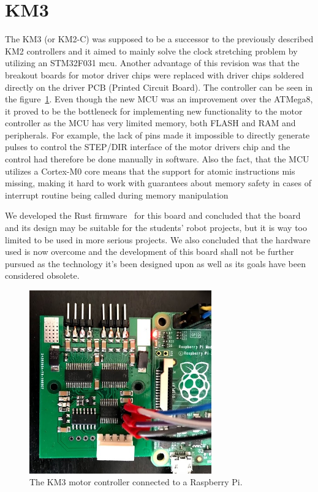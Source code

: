 \section{KM3}
\label{sec:km3}
The KM3 (or KM2-C) was supposed to be a successor to the previously described KM2 controllers and it aimed to mainly solve the clock stretching problem by utilizing an STM32F031 \acs{mcu}.
Another advantage of this revision was that the breakout boards for motor driver chips were replaced with driver chips soldered directly on the driver PCB (Printed Circuit Board).
The controller can be seen in the figure~\ref{fig:km3}.
Even though the new MCU was an improvement over the ATMega8, it proved to be the bottleneck for implementing new functionality to the motor controller as the MCU has very limited memory, both FLASH and RAM and peripherals.
For example, the lack of pins made it impossible to directly generate pulses to control the STEP/DIR interface of the motor drivers chip and the control had therefore be done manually in software.
Also the fact, that the MCU utilizes a Cortex-M0 core means that the support for atomic instructions mis missing, making it hard to work with guarantees about memory safety in cases of interrupt routine being called during memory manipulation

We developed the Rust firmware~\cite{hybl_robotics-butkm3-rs_2020} for this board and concluded that the board and its design may be suitable for the students' robot projects, but it is way too limited to be used in more serious projects.
We also concluded that the hardware used is now overcome and the development of this board shall not be further pursued as the technology it's been designed upon as well as its goals have been considered obsolete.

\begin{figure}[H]
    \centering
    \includegraphics[width=0.7\textwidth]{obrazky/km3}
    \caption{The KM3 motor controller connected to a Raspberry Pi.}
    \label{fig:km3}
\end{figure}

